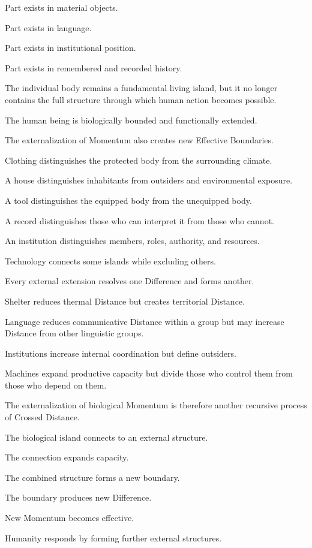 Part exists in material objects.

Part exists in language.

Part exists in institutional position.

Part exists in remembered and recorded history.

The individual body remains a fundamental living island, but it no longer contains the full structure through which human action becomes possible.

The human being is biologically bounded and functionally extended.

The externalization of Momentum also creates new Effective Boundaries.

Clothing distinguishes the protected body from the surrounding climate.

A house distinguishes inhabitants from outsiders and environmental exposure.

A tool distinguishes the equipped body from the unequipped body.

A record distinguishes those who can interpret it from those who cannot.

An institution distinguishes members, roles, authority, and resources.

Technology connects some islands while excluding others.

Every external extension resolves one Difference and forms another.

Shelter reduces thermal Distance but creates territorial Distance.

Language reduces communicative Distance within a group but may increase Distance from other linguistic groups.

Institutions increase internal coordination but define outsiders.

Machines expand productive capacity but divide those who control them from those who depend on them.

The externalization of biological Momentum is therefore another recursive process of Crossed Distance.

The biological island connects to an external structure.

The connection expands capacity.

The combined structure forms a new boundary.

The boundary produces new Difference.

New Momentum becomes effective.

Humanity responds by forming further external structures.

